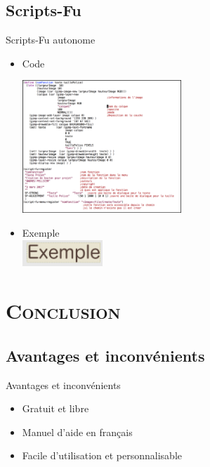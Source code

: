 \documentclass[xcolor=x11names,compress]{beamer}
\renewcommand{\(}{\begin{columns}}
\renewcommand{\)}{\end{columns}}
\newcommand{\<}[1]{\begin{column}{#1}}
\renewcommand{\>}{\end{column}}
\begin{document}
\subsection{Scripts-Fu}
\begin{frame}{Scripts-Fu autonome}
\begin{itemize}
\item Code 
\begin{center}
	\includegraphics[height=5cm]{fonction}
	\end{center}
\end{itemize}
\begin{itemize}
\item Exemple \\

	\includegraphics[height=1cm]{exemple}

\end{itemize}

\end{frame}

\section{\scshape Conclusion}
\subsection{Avantages et inconvénients}
\begin{frame}{Avantages et inconvénients}
\begin{itemize}
\item Gratuit et libre
\end{itemize}
\begin{itemize}
\item Manuel d'aide en français
\end{itemize}
\begin{itemize}
\item Facile d'utilisation et personnalisable
\end{itemize}
\end{frame}
\end{document}
